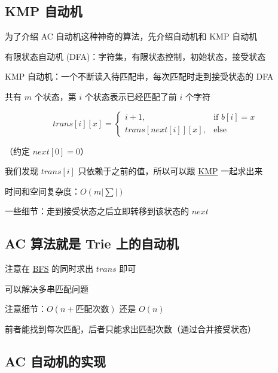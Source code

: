 
\subsection{KMP 自动机}

为了介绍 AC 自动机这种神奇的算法，先介绍自动机和 KMP 自动机

有限状态自动机 (DFA)：字符集，有限状态控制，初始状态，接受状态

KMP 自动机：一个不断读入待匹配串，每次匹配时走到接受状态的 DFA

共有 $m$ 个状态，第 $i$ 个状态表示已经匹配了前 $i$ 个字符

$$
trans[i][x] =
\begin{cases}
i + 1,  & \text{if $b[i] = x$} \\[2ex]
trans[next[i]][x], & \text{else}
\end{cases}
$$

（约定 $next[0]=0$）

我们发现 $trans[i]$ 只依赖于之前的值，所以可以跟 \href{/string/kmp}{KMP} 一起求出来

时间和空间复杂度：$O(m|∑|)$

一些细节：走到接受状态之后立即转移到该状态的 $next$

\subsection{AC 算法就是 Trie 上的自动机}

注意在 \href{/search/bfs}{BFS} 的同时求出 $trans$ 即可

可以解决多串匹配问题

注意细节：$O(n+匹配次数)$ 还是 $O(n)$

前者能找到每次匹配，后者只能求出匹配次数（通过合并接受状态）

\subsection{AC 自动机的实现}
